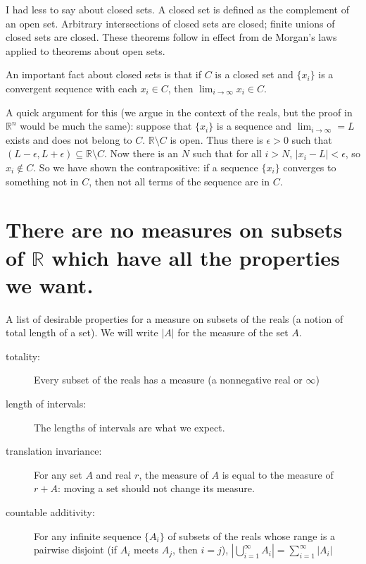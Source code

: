 \documentclass[12pt]{article}
\begin{document}
I had less to say about closed sets.  A closed set is defined as the complement of an open set.  Arbitrary intersections of closed sets are closed;  finite unions of closed sets are closed.
These theorems follow in effect from de Morgan's laws applied to theorems about open sets. 

 An important fact about closed sets is that if $C$ is a closed set and $\{x_i\}$ is a convergent sequence
with each $x_i \in C$, then $\lim_{i\rightarrow \infty}x_i \in C$.

A quick argument for this (we argue in the context of the reals, but the proof in $\mathbb R^n$ would be much the same):  suppose that $\{x_i\}$ is a sequence and $\lim_{i \rightarrow \infty}=L$ exists and does not belong to $C$.  $\mathbb R \setminus C$ is open.  Thus there is $\epsilon>0$ such that $(L - \epsilon,L + \epsilon) \subseteq \mathbb R \setminus C$.  Now there is an $N$ such that for all $i>N$, $|x_i-L|<\epsilon$, so $x_i \not\in C$.  So we have shown the contrapositive:  if a sequence $\{x_i\}$ converges to something not in $C$, then not all terms of the sequence are in $C$.

\section{There are no measures on subsets of $\mathbb R$ which have all the properties we want.}

A list of desirable properties for a measure on subsets of the reals (a notion of total length of a set).  We will write $|A|$ for the measure of the set $A$.

\begin{description}

\item[totality:]  Every subset of the reals has a measure (a nonnegative real or $\infty$)

\item[length of intervals:]  The lengths of intervals are what we expect.

\item[translation invariance:]   For any set $A$ and real $r$, the measure of $A$ is equal to the measure of $r+A$:  moving a set should not change its measure.

\item[countable additivity:]   For any infinite sequence $\{A_i\}$ of subsets of the reals whose range is a pairwise disjoint (if $A_i$ meets $A_j$, then $i=j$), $|\bigcup_{i=1}^{\infty} A_i| = \sum_{i=1}^\infty |A_i|$

\end{description}
\end{document}
